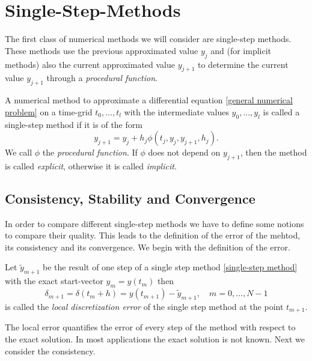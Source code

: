 \section{Single-Step-Methods}
	The first class of numerical methods we will consider are single-step methods. These methods use the previous approximated value $y_j$ and (for implicit methods) also the current approximated value $y_{j+1}$ to determine the current value $y_{j+1}$ through a \emph{procedural function}.
	
	\begin{definition}
		A numerical method to approximate a differential equation \ref{general numerical problem} on a time-grid $t_0,...,t_l$ with the intermediate values $y_0,...,y_l$ is called a single-step method if it is of the form
		\begin{equation}
			\label{single-step method}
			y_{j+1} = y_j + h_j \phi(t_j,y_j, y_{j+1},h_j).
		\end{equation}
		We call $\phi$ the \emph{procedural function}. If $\phi$ does not depend on $y_{j+1}$, then the method is called \emph{explicit}, otherwise it is called \emph{implicit}.
	\end{definition}

	\subsection{Consistency, Stability and Convergence}
	
	In order to compare different single-step methods we have to define some notions to compare their quality. This leads to the definition of the error of the mehtod, its consistency and its convergence. We begin with the definition of the error.
	
	\begin{definition}\label{Discretization_Error_SingleStep}
		Let $\tilde{y}_{m+1}$ be the result of one step of a single step method \eqref{single-step method} with the exact start-vector $y_m = y(t_m)$ then
		\begin{equation}
			\label{local discretization error single step}
			 \delta_{m+1} = \delta(t_m+h) = y(t_{m+1}) - \tilde{y}_{m+1}, \quad m = 0,...,N-1
		\end{equation}
		is called the \emph{local discretization error} of the single step method at the point $t_{m+1}$.
	\end{definition}

	The local error quantifies the error of every step of the method with respect to the exact solution. In most applications the exact solution is not known. Next we consider the consistency.

